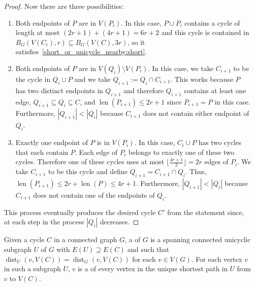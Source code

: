 \documentclass{patmorin}
\DeclareMathOperator{\len}{len}
\DeclareMathOperator{\dist}{dist}
\begin{document}
\begin{proof}
  Now there are three possibilities:
  \begin{enumerate}
    \item Both endpoints of $P$ are in $V(P_{i})$.
    In this case, $P\cup P_{i}$ contains a cycle of length at most
    $(2r+1)+(4r+1)=6r+2$ and this cycle is contained in $B_G(V(C_i),r)\subseteq B_G(V(C),3r)$, so it satisfies~\eqref{short_or_unicycle_nearby:short}.
    \item Both endpoints of $P$ are in $V(Q_{i})\setminus V(P_{i})$.
    In this case, we take $C_{i+1}$ to be the cycle
    in $Q_{i}\cup P$ and
    we take $Q_{i+1}:= Q_i\cap C_{i+1}$. %
    This works because $P$ has two distinct endpoints in $Q_{i+1}$
    and therefore $Q_{i+1}$ contains at least one edge,
    $Q_{i+1}\subseteq Q_i\subseteq C$, and
    $\len(P_{i+1})\leq 2r+1$ since $P_{i+1}=P$ in this case.
    Furthermore, $|Q_{i+1}| < |Q_{i}|$ because $C_{i+1}$ does not contain either endpoint of $Q_{i}$.
    \item Exactly one endpoint of $P$ is in $V(P_{i})$.
    In this case, $C_{i}\cup P$ has two cycles that each contain $P$.
    Each edge of $P_{i}$ belongs to exactly one of these two cycles.
    Therefore one of these cycles uses at most $\lfloor\frac{4r+1}{2}\rfloor=2r$ edges of $P_{i}$.
    We take $C_{i+1}$ to be this cycle and define
    $Q_{i+1}=C_{i+1}\cap Q_i$. %
    Thus, $\len(P_{i+1}) \leq 2r+\len(P)\leq 4r+1$.
    Furthermore, $|Q_{i+1}| < |Q_{i}|$ because $C_{i+1}$ does not contain one of the endpoints of $Q_{i}$.
  \end{enumerate}
  This process eventually produces the desired cycle $C'$ from the statement since, at each step in the process $|Q_i|$ decreases.
\end{proof}

Given a cycle $C$ in a connected graph $G$, a  of $G$ is a spanning connected unicyclic subgraph $U$ of $G$ with $E(U)\supseteq E(C)$ and such that $\dist_U(v,V(C))=\dist_G(v,V(C))$ for each $v\in V(G)$.  For each vertex $v$ in such a subgraph $U$, $v$ is a  of every vertex in the unique shortest path in $U$ from $v$ to $V(C)$.
\end{document}
